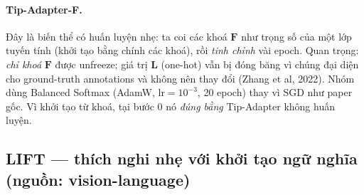 \paragraph{Tip-Adapter-F.}
Đây là biến thể có huấn luyện nhẹ: ta coi các khoá $\mathbf{F}$ như trọng số của một lớp tuyến tính
(khởi tạo bằng chính các khoá), rồi \emph{tinh chỉnh} vài epoch. Quan trọng: \emph{chỉ khoá}
$\mathbf{F}$ được unfreeze; giá trị $\mathbf{L}$ (one-hot) vẫn bị đóng băng vì chúng đại diện cho
ground-truth annotations và không nên thay đổi \cite{zhang2022tip} (Zhang et al, 2022). Nhóm dùng Balanced Softmax
(AdamW, $\text{lr}=10^{-3}$, 20 epoch) thay vì SGD như paper gốc. Vì khởi tạo từ khoá, tại bước 0
nó \emph{đúng bằng} Tip-Adapter không huấn luyện.

\subsection{LIFT --- thích nghi nhẹ với khởi tạo ngữ nghĩa (nguồn: vision-language)}

